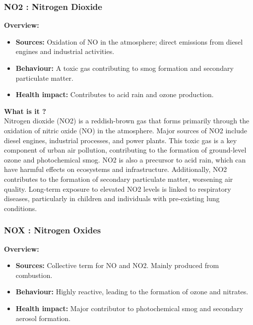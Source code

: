 \documentclass{modeleRapport}
\begin{document}
\subsubsection{NO2 : Nitrogen Dioxide}

\textbf{Overview:}\\

\begin{itemize}
    \item \textbf{Sources:} Oxidation of NO in the atmosphere; direct emissions from diesel engines and industrial activities.
    \item \textbf{Behaviour:} A toxic gas contributing to smog formation and secondary particulate matter.
    \item \textbf{Health impact:} Contributes to acid rain and ozone production.\\
\end{itemize}

\textbf{What is it ?}\\

Nitrogen dioxide (NO2) is a reddish-brown gas that forms primarily through the oxidation of nitric oxide (NO) in the 
atmosphere. Major sources of NO2 include diesel engines, industrial processes, and power plants. This toxic gas is a key 
component of urban air pollution, contributing to the formation of ground-level ozone and photochemical smog. NO2 is also 
a precursor to acid rain, which can have harmful effects on ecosystems and infrastructure. Additionally, NO2 contributes to 
the formation of secondary particulate matter, worsening air quality. Long-term exposure to elevated NO2 levels is linked to 
respiratory diseases, particularly in children and individuals with pre-existing lung conditions.\\


\subsubsection{NOX : Nitrogen Oxides}

\textbf{Overview:}\\

\begin{itemize}
    \item \textbf{Sources:} Collective term for NO and NO2. Mainly produced from combustion.
    \item \textbf{Behaviour:} Highly reactive, leading to the formation of ozone and nitrates.
    \item \textbf{Health impact:} Major contributor to photochemical smog and secondary aerosol formation.\\
\end{itemize}
\end{document}
